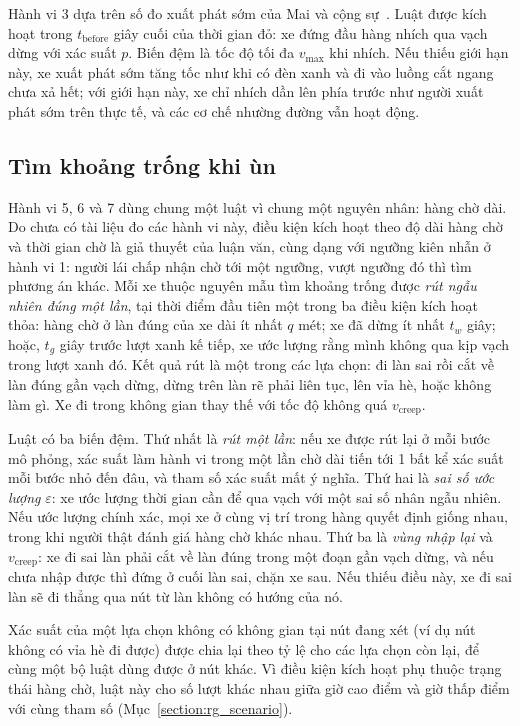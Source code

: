 \documentclass[../main.tex]{subfiles}
\begin{document}
Hành vi 3 dựa trên số đo xuất phát sớm của Mai và cộng sự~\cite{mai2019signal}. Luật được kích hoạt trong $t_{\text{before}}$ giây cuối của thời gian đỏ: xe đứng đầu hàng nhích qua vạch dừng với xác suất $p$. Biến đệm là tốc độ tối đa $v_{\max}$ khi nhích. Nếu thiếu giới hạn này, xe xuất phát sớm tăng tốc như khi có đèn xanh và đi vào luồng cắt ngang chưa xả hết; với giới hạn này, xe chỉ nhích dần lên phía trước như người xuất phát sớm trên thực tế, và các cơ chế nhường đường vẫn hoạt động.

\subsection{Tìm khoảng trống khi ùn}

Hành vi 5, 6 và 7 dùng chung một luật vì chung một nguyên nhân: hàng chờ dài. Do chưa có tài liệu đo các hành vi này, điều kiện kích hoạt theo độ dài hàng chờ và thời gian chờ là giả thuyết của luận văn, cùng dạng với ngưỡng kiên nhẫn ở hành vi 1: người lái chấp nhận chờ tới một ngưỡng, vượt ngưỡng đó thì tìm phương án khác. Mỗi xe thuộc nguyên mẫu tìm khoảng trống được \emph{rút ngẫu nhiên đúng một lần}, tại thời điểm đầu tiên một trong ba điều kiện kích hoạt thỏa: hàng chờ ở làn đúng của xe dài ít nhất $q$ mét; xe đã dừng ít nhất $t_w$ giây; hoặc, $t_g$ giây trước lượt xanh kế tiếp, xe ước lượng rằng mình không qua kịp vạch trong lượt xanh đó. Kết quả rút là một trong các lựa chọn: đi làn sai rồi cắt về làn đúng gần vạch dừng, dừng trên làn rẽ phải liên tục, lên vỉa hè, hoặc không làm gì. Xe đi trong không gian thay thế với tốc độ không quá $v_{\text{creep}}$.

Luật có ba biến đệm. Thứ nhất là \emph{rút một lần}: nếu xe được rút lại ở mỗi bước mô phỏng, xác suất làm hành vi trong một lần chờ dài tiến tới 1 bất kể xác suất mỗi bước nhỏ đến đâu, và tham số xác suất mất ý nghĩa. Thứ hai là \emph{sai số ước lượng} $\varepsilon$: xe ước lượng thời gian cần để qua vạch với một sai số nhân ngẫu nhiên. Nếu ước lượng chính xác, mọi xe ở cùng vị trí trong hàng quyết định giống nhau, trong khi người thật đánh giá hàng chờ khác nhau. Thứ ba là \emph{vùng nhập lại} và $v_{\text{creep}}$: xe đi sai làn phải cắt về làn đúng trong một đoạn gần vạch dừng, và nếu chưa nhập được thì đứng ở cuối làn sai, chặn xe sau. Nếu thiếu điều này, xe đi sai làn sẽ đi thẳng qua nút từ làn không có hướng của nó.

Xác suất của một lựa chọn không có không gian tại nút đang xét (ví dụ nút không có vỉa hè đi được) được chia lại theo tỷ lệ cho các lựa chọn còn lại, để cùng một bộ luật dùng được ở nút khác. Vì điều kiện kích hoạt phụ thuộc trạng thái hàng chờ, luật này cho số lượt khác nhau giữa giờ cao điểm và giờ thấp điểm với cùng tham số (Mục~\ref{section:rg_scenario}).
\end{document}
